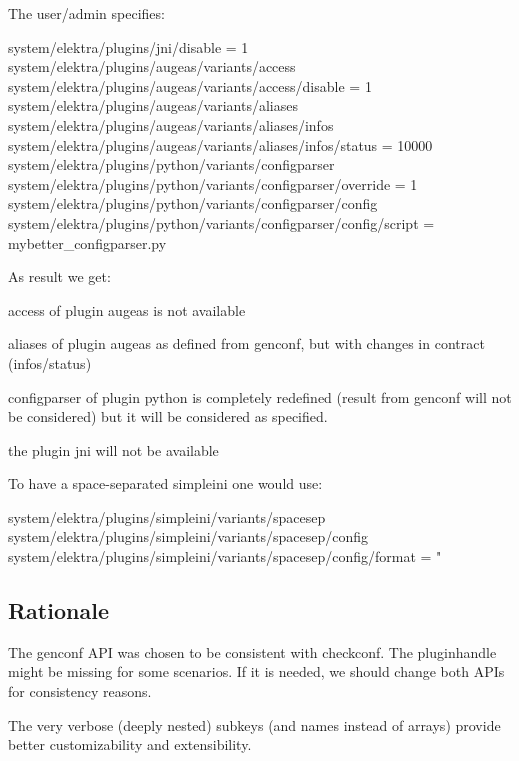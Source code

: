 The user/admin specifies\+: 
\begin{DoxyCode}
system/elektra/plugins/jni/disable = 1
system/elektra/plugins/augeas/variants/access
system/elektra/plugins/augeas/variants/access/disable = 1
system/elektra/plugins/augeas/variants/aliases
system/elektra/plugins/augeas/variants/aliases/infos
system/elektra/plugins/augeas/variants/aliases/infos/status = 10000
system/elektra/plugins/python/variants/configparser
system/elektra/plugins/python/variants/configparser/override = 1
system/elektra/plugins/python/variants/configparser/config
system/elektra/plugins/python/variants/configparser/config/script = mybetter\_configparser.py
\end{DoxyCode}


As result we get\+:


\begin{DoxyEnumerate}
\item {\ttfamily access} of plugin {\ttfamily augeas} is not available
\item {\ttfamily aliases} of plugin {\ttfamily augeas} as defined from {\ttfamily genconf}, but with changes in contract ({\ttfamily infos/status})
\item {\ttfamily configparser} of plugin {\ttfamily python} is completely redefined (result from {\ttfamily genconf} will not be considered) but it will be considered as specified.
\item the plugin {\ttfamily jni} will not be available
\end{DoxyEnumerate}

To have a space-\/separated simpleini one would use\+: 
\begin{DoxyCode}
system/elektra/plugins/simpleini/variants/spacesep
system/elektra/plugins/simpleini/variants/spacesep/config
system/elektra/plugins/simpleini/variants/spacesep/config/format = "%
\end{DoxyCode}


\subsection*{Rationale}


\begin{DoxyItemize}
\item The {\ttfamily genconf} A\+PI was chosen to be consistent with {\ttfamily checkconf}. The pluginhandle might be missing for some scenarios. If it is needed, we should change both A\+P\+Is for consistency reasons.
\item The very verbose (deeply nested) subkeys (and names instead of arrays) provide better customizability and extensibility.
\end{DoxyItemize}

